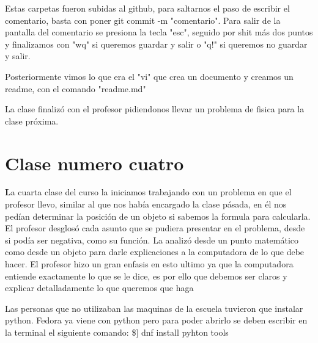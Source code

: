 \documentclass{book}
\begin{document}
\begin{enumerate}
Estas carpetas fueron subidas al github, para saltarnos el paso de escribir el comentario, basta con poner git commit -m "comentario".
Para salir de la pantalla del comentario se presiona la tecla "esc", seguido por shit más dos puntos y finalizamos con "wq" si queremos guardar y salir o "q!" si queremos no guardar y salir.

Posteriormente vimos lo que era el "vi" que crea un documento y creamos un readme, con el comando "readme.md"


La clase finalizó con el profesor pidiendonos llevar un problema de fisica para la clase próxima.

\chapter{Clase numero cuatro}
\textbf La cuarta clase del curso la iniciamos trabajando con un problema en que el profesor llevo, similar al que nos había encargado la clase pásada, en él nos pedían determinar la posición de un objeto si sabemos la formula para calcularla. El profesor desglosó cada asunto que se pudiera presentar en el problema, desde si podía ser negativa, como su función. La analizó desde un punto matemático como desde un objeto para darle explicaciones a la computadora de lo que debe hacer. El profesor hizo un gran enfasis en esto ultimo ya que la computadora entiende exactamente lo que se le dice, es por ello que debemos ser claros y explicar detalladamente lo que queremos que haga

Las personas que no utilizaban las maquinas de la escuela tuvieron que instalar python. Fedora ya viene con python pero para poder abrirlo se deben escribir en la terminal el siguiente comando: \$] dnf install pyhton tools \\ 


\end{enumerate}
\end{document}
